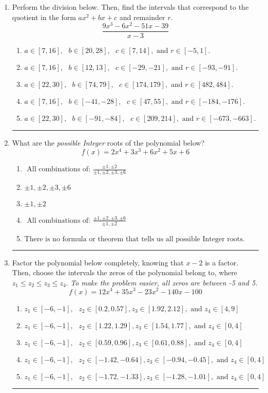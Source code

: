 \documentclass[14pt]{extbook}
\newcommand{\litem}[1]{\item#1\hspace*{-1cm}\rule{\textwidth}{0.4pt}}
\begin{document}
\begin{enumerate}
\litem{
Perform the division below. Then, find the intervals that correspond to the quotient in the form $ax^2+bx+c$ and remainder $r$.\[ \frac{9x^{3} -6 x^{2} -51 x -39}{x -3} \]\begin{enumerate}[label=\Alph*.]
\item \( a \in [7, 16], \text{   } b \in [20, 28], \text{   } c \in [7, 14], \text{   and   } r \in [-5, 1]. \)
\item \( a \in [7, 16], \text{   } b \in [12, 13], \text{   } c \in [-29, -21], \text{   and   } r \in [-93, -91]. \)
\item \( a \in [22, 30], \text{   } b \in [74, 79], \text{   } c \in [174, 179], \text{   and   } r \in [482, 484]. \)
\item \( a \in [7, 16], \text{   } b \in [-41, -28], \text{   } c \in [47, 55], \text{   and   } r \in [-184, -176]. \)
\item \( a \in [22, 30], \text{   } b \in [-91, -84], \text{   } c \in [209, 214], \text{   and   } r \in [-673, -663]. \)

\end{enumerate} }
\litem{
What are the \textit{possible Integer} roots of the polynomial below?\[ f(x) = 2x^{4} +3 x^{3} +6 x^{2} +5 x + 6 \]\begin{enumerate}[label=\Alph*.]
\item \( \text{ All combinations of: }\frac{\pm 1,\pm 2}{\pm 1,\pm 2,\pm 3,\pm 6} \)
\item \( \pm 1,\pm 2,\pm 3,\pm 6 \)
\item \( \pm 1,\pm 2 \)
\item \( \text{ All combinations of: }\frac{\pm 1,\pm 2,\pm 3,\pm 6}{\pm 1,\pm 2} \)
\item \( \text{There is no formula or theorem that tells us all possible Integer roots.} \)

\end{enumerate} }
\litem{
Factor the polynomial below completely, knowing that $x-2$ is a factor. Then, choose the intervals the zeros of the polynomial belong to, where $z_1 \leq z_2 \leq z_3 \leq z_4$. \textit{To make the problem easier, all zeros are between -5 and 5.}\[ f(x) = 12x^{4} +35 x^{3} -23 x^{2} -140 x -100 \]\begin{enumerate}[label=\Alph*.]
\item \( z_1 \in [-6, -1], \text{   }  z_2 \in [0.2, 0.57], z_3 \in [1.92, 2.12], \text{   and   } z_4 \in [4, 9] \)
\item \( z_1 \in [-6, -1], \text{   }  z_2 \in [1.22, 1.29], z_3 \in [1.54, 1.77], \text{   and   } z_4 \in [0, 4] \)
\item \( z_1 \in [-6, -1], \text{   }  z_2 \in [0.59, 0.96], z_3 \in [0.61, 0.88], \text{   and   } z_4 \in [0, 4] \)
\item \( z_1 \in [-6, -1], \text{   }  z_2 \in [-1.42, -0.64], z_3 \in [-0.94, -0.45], \text{   and   } z_4 \in [0, 4] \)
\item \( z_1 \in [-6, -1], \text{   }  z_2 \in [-1.72, -1.33], z_3 \in [-1.28, -1.01], \text{   and   } z_4 \in [0, 4] \)


\end{enumerate}}
\end{enumerate}
\end{document}
